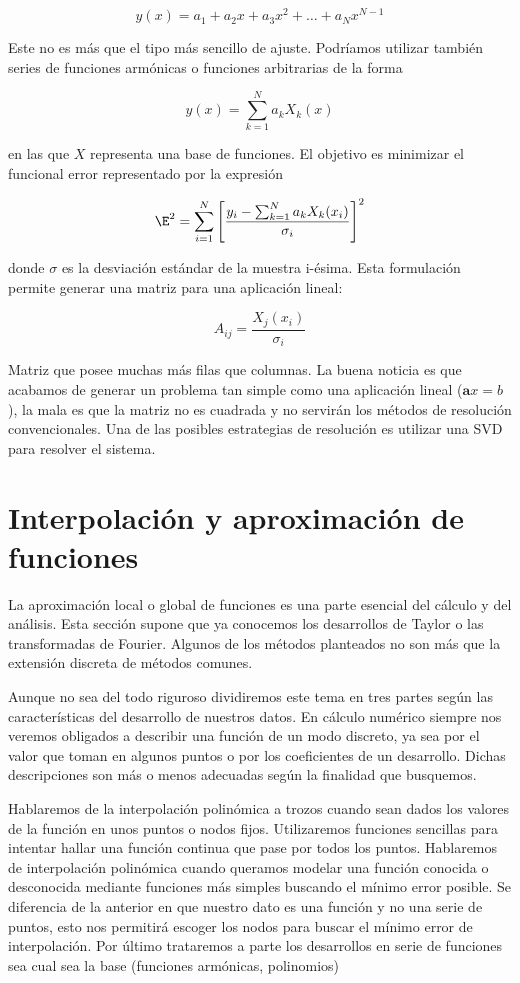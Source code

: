 $$
y(x)=a_{1}+a_{2}x+a_{3}x^{2}+\ldots+a_{N}x^{N-1}$$

Este no es más que el tipo más sencillo de ajuste. Podríamos utilizar
también series de funciones armónicas o funciones arbitrarias de la
forma

$$
y(x)=\sum_{k=1}^{N}a_{k}X_{k}(x)$$

en las que $X$ representa una base de funciones. El objetivo es
minimizar el funcional error representado por la expresión

$$
\E^{2}=\sum_{i=1}^{N}\left[
  \frac{y_{i}-\sum_{k=1}^{N}a_{k}X_{k}(x_{i})}{\sigma_{i}}\right]^{2}
$$

donde $\sigma$ es la desviación estándar de la muestra i-ésima. Esta
formulación permite generar una matriz para una aplicación lineal:

$$
A_{ij}=\frac{X_{j}(x_{i})}{\sigma_{i}}$$

Matriz que posee muchas más filas que columnas. La buena noticia es
que acabamos de generar un problema tan simple como una aplicación
lineal ($\mathbf{a}x=b$), la mala es que la matriz no es cuadrada y no
servirán los métodos de resolución convencionales. Una de las posibles
estrategias de resolución es utilizar una SVD para resolver el
sistema.

\section{Interpolación y aproximación de funciones}

La aproximación local o global de funciones es una parte esencial del
cálculo y del análisis.  Esta sección supone que ya conocemos los
desarrollos de Taylor o las transformadas de Fourier.  Algunos de los
métodos planteados no son más que la extensión discreta de métodos
comunes.

Aunque no sea del todo riguroso dividiremos este tema en tres partes
según las características del desarrollo de nuestros datos.  En
cálculo numérico siempre nos veremos obligados a describir una función
de un modo discreto, ya sea por el valor que toman en algunos puntos o
por los coeficientes de un desarrollo.  Dichas descripciones son más o
menos adecuadas según la finalidad que busquemos.

Hablaremos de la interpolación polinómica a trozos cuando sean dados
los valores de la función en unos puntos o nodos fijos.  Utilizaremos
funciones sencillas para intentar hallar una función continua que pase
por todos los puntos.  Hablaremos de interpolación polinómica cuando
queramos modelar una función conocida o desconocida mediante funciones
más simples buscando el mínimo error posible.  Se diferencia de la
anterior en que nuestro dato es una función y no una serie de puntos,
esto nos permitirá escoger los nodos para buscar el mínimo error de
interpolación.  Por último trataremos a parte los desarrollos en serie
de funciones sea cual sea la base (funciones armónicas, polinomios)


